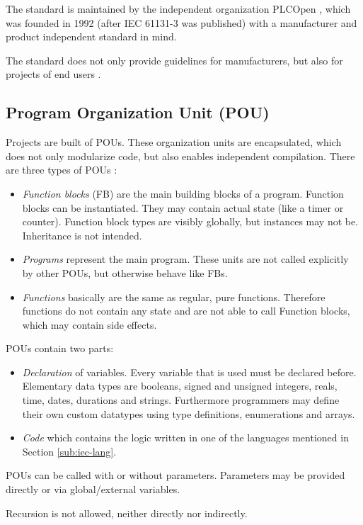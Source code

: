 The standard is maintained by the independent organization PLCOpen \cite{eldijkWhatPLCopen2018}, which was founded in 1992 (after IEC 61131-3 was published) with a manufacturer and product independent standard in mind.


The standard does not only provide guidelines for manufacturers, but also for projects of end users \cite{johnIEC611313Programming2010}.
\pagebreak
\subsection{Program Organization Unit (POU)}
\label{sub:pou}
Projects are built of POUs. These organization units are encapsulated, which does not only modularize code, but also enables independent compilation.
There are three types of POUs \cite{johnIEC611313Programming2010}:
\begin{itemize}
	\item \emph{Function blocks} (FB) are the main building blocks of a program. Function blocks can be instantiated. They may contain actual state (like a timer or counter). Function block types are visibly globally, but instances may not be. Inheritance is not intended.
	\item \emph{Programs} represent the main program. These units are not called explicitly by other POUs, but otherwise behave like FBs.
	\item \emph{Functions} basically are the same as regular, pure functions. Therefore functions do not contain any state and are not able to call Function blocks, which may contain side effects. 
\end{itemize}
POUs contain two parts:
\begin{itemize}
	\item \emph{Declaration} of variables. Every variable that is used must be declared before. Elementary data types are booleans, signed and unsigned integers, reals, time, dates, durations and strings. Furthermore programmers may define their own custom datatypes using type definitions, enumerations and arrays.
	\item \emph{Code} which contains the logic written in one of the languages mentioned in Section \ref{sub:iec-lang}.
\end{itemize}
POUs can be called with or without parameters. Parameters may be provided directly or via global/external variables.

Recursion is not allowed, neither directly nor indirectly. 


